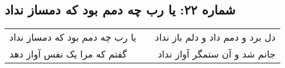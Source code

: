 \begin{center}
\section*{شماره ۲۲: یا رب چه دمم بود که دمساز نداد}
\label{sec:022}
\begin{longtable}{l p{0.5cm} r}
یا رب چه دمم بود که دمساز نداد
&&
دل برد و دمم داد و دلم باز نداد
\\
گفتم که مرا یک نفس آواز دهد
&&
جانم شد و آن ستمگر آواز نداد
\\
\end{longtable}
\end{center}
